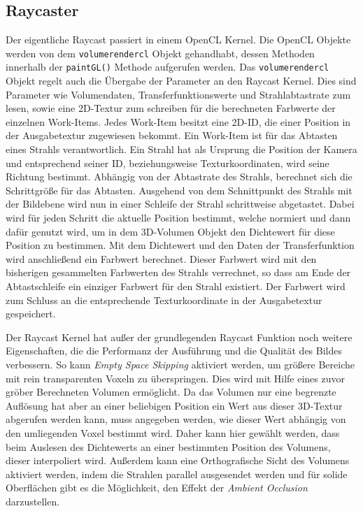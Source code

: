 \subsection*{Raycaster}\label{ss::rc}
Der eigentliche Raycast passiert in einem OpenCL Kernel.
Die OpenCL Objekte werden von dem \texttt{volumerendercl} Objekt gehandhabt, dessen Methoden innerhalb der \texttt{paintGL()} Methode aufgerufen werden.
Das \texttt{volumerendercl} Objekt regelt auch die Übergabe der Parameter an den Raycast Kernel.
Dies sind Parameter wie Volumendaten, Transferfunktionswerte und Strahlabtastrate zum lesen, sowie eine 2D-Textur zum schreiben für die berechneten Farbwerte der einzelnen Work-Items.
Jedes Work-Item besitzt eine 2D-ID, die einer Position in der Ausgabetextur zugewiesen bekommt.
Ein Work-Item ist für das Abtasten eines Strahls verantwortlich.
Ein Strahl hat als Ursprung die Position der Kamera und entsprechend seiner ID, beziehungsweise Texturkoordinaten, wird seine Richtung bestimmt.
Abhängig von der Abtastrate des Strahls, berechnet sich die Schrittgröße für das Abtasten. 
Ausgehend von dem Schnittpunkt des Strahls mit der Bildebene wird nun in einer Schleife der Strahl schrittweise abgetastet.
Dabei wird für jeden Schritt die aktuelle Position bestimmt, welche normiert und dann dafür genutzt wird, um in dem 3D-Volumen Objekt den Dichtewert für diese Position zu bestimmen.
Mit dem Dichtewert und den Daten der Transferfunktion wird anschließend ein Farbwert berechnet.
Dieser Farbwert wird mit den bisherigen gesammelten Farbwerten des Strahls verrechnet, so dass am Ende der Abtastschleife ein einziger Farbwert für den Strahl existiert.
Der Farbwert wird zum Schluss an die entsprechende Texturkoordinate in der Ausgabetextur gespeichert.

Der Raycast Kernel hat außer der grundlegenden Raycast Funktion noch weitere Eigenschaften, die die Performanz der Ausführung und die Qualität des Bildes verbessern.
So kann \emph{Empty Space Skipping} aktiviert werden, um größere Bereiche mit rein transparenten Voxeln zu überspringen.
Dies wird mit Hilfe eines zuvor gröber Berechneten Volumen ermöglicht.
Da das Volumen nur eine begrenzte Auflösung hat aber an einer beliebigen Position ein Wert aus dieser 3D-Textur abgerufen werden kann, muss angegeben werden, wie dieser Wert abhängig von den umliegenden Voxel bestimmt wird.
Daher kann hier gewählt werden, dass beim Auslesen des Dichtewerts an einer bestimmten Position des Volumens, dieser interpoliert wird.
Außerdem kann eine Orthografische Sicht des Volumens aktiviert werden, indem die Strahlen parallel ausgesendet werden und für solide Oberflächen gibt es die Möglichkeit, den Effekt der \emph{Ambient Occlusion} darzustellen.

